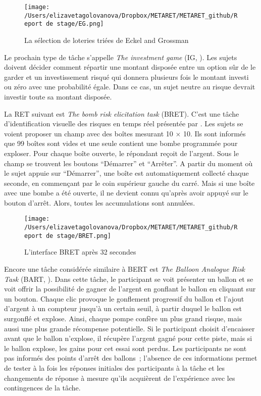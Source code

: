 \documentclass[12pt]{article}
\begin{document}
\begin{figure}
\centering
\texttt{[image: /Users/elizavetagolovanova/Dropbox/METARET/METARET\_github/Report de stage/EG.png]}
\caption{La sélection de loteries triées de Eckel and Grossman}
\end{figure}

Le prochain type de tâche s'appelle \emph{The investment game} (IG,
\citet{Gneezy1997}). Les sujets doivent décider comment répartir une
montant disposée entre un option sûr de le garder et un investissement
risqué qui donnera plusieurs fois le montant investi ou zéro avec une
probabilité égale. Dans ce cas, un sujet neutre au risque devrait
investir toute sa montant disposée.

La RET suivant est \emph{The bomb risk elicitation task} (BRET). C'est
une tâche d'identification visuelle des risques en temps réel présentée
par \citet{CroFil2013b}. Les sujets se voient proposer un champ avec des
boîtes mesurant 10 × 10. Ils sont informés que 99 boîtes sont vides et
une seule contient une bombe programmée pour exploser. Pour chaque boîte
ouverte, le répondant reçoit de l'argent. Sous le champ se trouvent les
boutons ``Démarrer'' et ``Arrêter''. A partir du moment où le sujet
appuie sur ``Démarrer'', une boîte est automatiquement collecté chaque
seconde, en commençant par le coin supérieur gauche du carré. Mais si
une boîte avec une bombe a été ouverte, il ne devient connu qu'après
avoir appuyé sur le bouton d'arrêt. Alors, toutes les accumulations sont
annulées.

\begin{figure}
\centering
\texttt{[image: /Users/elizavetagolovanova/Dropbox/METARET/METARET\_github/Report de stage/BRET.png]}
\caption{L'interface BRET après 32 secondes}
\end{figure}

Encore une tâche considérée similaire à BERT est \emph{The Balloon
Analogue Risk Task} (BART, \citet{Hunt2005}). Dans cette tâche, le
participant se voit présenter un ballon et se voit offrir la possibilité
de gagner de l'argent en gonflant le ballon en cliquant sur un bouton.
Chaque clic provoque le gonflement progressif du ballon et l'ajout
d'argent à un compteur jusqu'à un certain seuil, à partir duquel le
ballon est surgonflé et explose. Ainsi, chaque pompe confère un plus
grand risque, mais aussi une plus grande récompense potentielle. Si le
participant choisit d'encaisser avant que le ballon n'explose, il
récupère l'argent gagné pour cette piste, mais si le ballon explose, les
gains pour cet essai sont perdus. Les participants ne sont pas informés
des points d'arrêt des ballons~; l'absence de ces informations permet de
tester à la fois les réponses initiales des participants à la tâche et
les changements de réponse à mesure qu'ils acquièrent de l'expérience
avec les contingences de la tâche.
\end{document}
